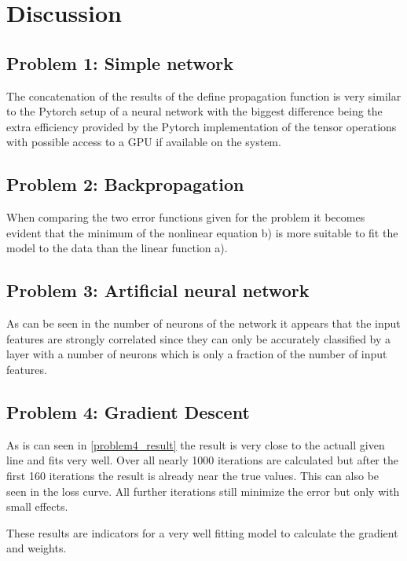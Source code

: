 \chapter{Discussion}
\section{Problem 1: Simple network}
The concatenation of the results of the define propagation function is very similar to the Pytorch setup of a neural network with the biggest difference being the extra efficiency provided by the Pytorch implementation of the tensor operations with possible access to a GPU if available on the system.
\section{Problem 2: Backpropagation}
When comparing the two error functions given for the problem it becomes evident that the minimum of the nonlinear equation b) is more suitable to fit the model to the data than the linear function a).
\section{Problem 3: Artificial neural network}
As can be seen in the number of neurons of the network it appears that the input features are strongly correlated since they can only be accurately classified by a layer with a number of neurons which is only a fraction of the number of input features.
\section{Problem 4: Gradient Descent}
As is can seen in \ref{problem4_result} the result is very close to the actuall given line and fits very well.
Over all nearly 1000 iterations are calculated but after the first 160 iterations the result is already near the true values. 
This can also be seen in the loss curve.
All further iterations still minimize the error but only with small effects.

These results are indicators for a very well fitting model to calculate the gradient and weights.
